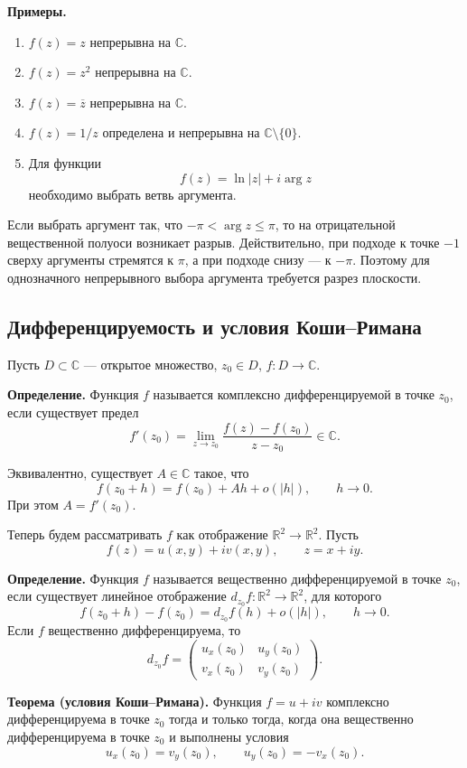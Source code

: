 \documentclass[12pt,a4paper]{article}
\newcommand{\CC}{\mathbb C}
\newcommand{\RR}{\mathbb R}
\begin{document}
\textbf{Примеры.}
\begin{enumerate}[label=\arabic*)]
  \item \(f(z)=z\) непрерывна на \(\CC\).
  \item \(f(z)=z^2\) непрерывна на \(\CC\).
  \item \(f(z)=\overline z\) непрерывна на \(\CC\).
  \item \(f(z)=1/z\) определена и непрерывна на \(\CC\setminus\{0\}\).
  \item Для функции
  \[
  f(z)=\ln|z|+i\arg z
  \]
  необходимо выбрать ветвь аргумента.
\end{enumerate}

Если выбрать аргумент так, что \(-\pi<\arg z\leq\pi\), то на отрицательной
вещественной полуоси возникает разрыв. Действительно, при подходе к точке
\(-1\) сверху аргументы стремятся к \(\pi\), а при подходе снизу --- к
\(-\pi\). Поэтому для однозначного непрерывного выбора аргумента требуется
разрез плоскости.

\subsection{Дифференцируемость и условия Коши--Римана}

Пусть \(D\subset\CC\) --- открытое множество, \(z_0\in D\),
\(f:D\to\CC\).

\textbf{Определение.} Функция \(f\) называется комплексно дифференцируемой
в точке \(z_0\), если существует предел
\[
f'(z_0)=\lim\limits_{z\to z_0}
\frac{f(z)-f(z_0)}{z-z_0}\in\CC.
\]

Эквивалентно, существует \(A\in\CC\) такое, что
\[
f(z_0+h)=f(z_0)+Ah+o(|h|),\qquad h\to0.
\]
При этом \(A=f'(z_0)\).

Теперь будем рассматривать \(f\) как отображение \(\RR^2\to\RR^2\). Пусть
\[
f(z)=u(x,y)+iv(x,y),\qquad z=x+iy.
\]

\textbf{Определение.} Функция \(f\) называется вещественно дифференцируемой
в точке \(z_0\), если существует линейное отображение
\(d_{z_0}f:\RR^2\to\RR^2\), для которого
\[
f(z_0+h)-f(z_0)=d_{z_0}f(h)+o(|h|),\qquad h\to0.
\]
Если \(f\) вещественно дифференцируема, то
\[
d_{z_0}f=
\begin{pmatrix}
 u_x(z_0) & u_y(z_0)\\
 v_x(z_0) & v_y(z_0)
\end{pmatrix}.
\]

\textbf{Теорема (условия Коши--Римана).}
Функция \(f=u+iv\) комплексно дифференцируема в точке \(z_0\) тогда и
только тогда, когда она вещественно дифференцируема в точке \(z_0\) и
выполнены условия
\[
u_x(z_0)=v_y(z_0),\qquad
u_y(z_0)=-v_x(z_0).
\]
\end{document}
